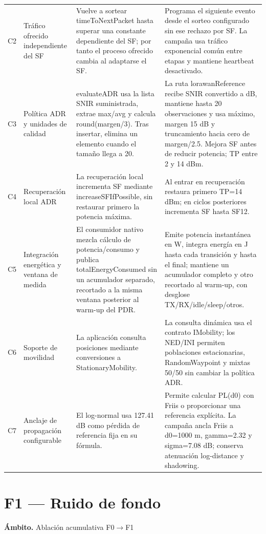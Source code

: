 \documentclass[10pt,a4paper]{article}
\begin{document}
\begin{longtable}{@{}p{0.65cm}p{3.0cm}p{6.1cm}p{6.0cm}@{}}
C2 & Tráfico ofrecido independiente del SF & Vuelve a sortear timeToNextPacket hasta superar una constante dependiente del SF; por tanto el proceso ofrecido cambia al adaptarse el SF. & Programa el siguiente evento desde el sorteo configurado sin ese rechazo por SF. La campaña usa tráfico exponencial común entre etapas y mantiene heartbeat desactivado.\\[5pt]
C3 & Política ADR y unidades de calidad & evaluateADR usa la lista SNIR suministrada, extrae max/avg y calcula round(margen/3). Tras insertar, elimina un elemento cuando el tamaño llega a 20. & La ruta lorawanReference recibe SNIR convertido a dB, mantiene hasta 20 observaciones y usa máximo, margen 15 dB y truncamiento hacia cero de margen/2.5. Mejora SF antes de reducir potencia; TP entre 2 y 14 dBm.\\[5pt]
C4 & Recuperación local ADR & La recuperación local incrementa SF mediante increaseSFIfPossible, sin restaurar primero la potencia máxima. & Al entrar en recuperación restaura primero TP=14 dBm; en ciclos posteriores incrementa SF hasta SF12.\\[5pt]
C5 & Integración energética y ventana de medida & El consumidor nativo mezcla cálculo de potencia/consumo y publica totalEnergyConsumed sin un acumulador separado, recortado a la misma ventana posterior al warm-up del PDR. & Emite potencia instantánea en W, integra energía en J hasta cada transición y hasta el final; mantiene un acumulador completo y otro recortado al warm-up, con desglose TX/RX/idle/sleep/otros.\\[5pt]
C6 & Soporte de movilidad & La aplicación consulta posiciones mediante conversiones a StationaryMobility. & La consulta dinámica usa el contrato IMobility; los NED/INI permiten poblaciones estacionarias, RandomWaypoint y mixtas 50/50 sin cambiar la política ADR.\\[5pt]
C7 & Anclaje de propagación configurable & El log-normal usa 127.41 dB como pérdida de referencia fija en su fórmula. & Permite calcular PL(d0) con Friis o proporcionar una referencia explícita. La campaña ancla Friis a d0=1000 m, gamma=2.32 y sigma=7.08 dB; conserva atenuación log-distance y shadowing.\\[5pt]
\bottomrule\end{longtable}\normalsize
\section*{F1 — Ruido de fondo}
\textbf{Ámbito.} Ablación acumulativa F0$\to$F1
\end{document}
